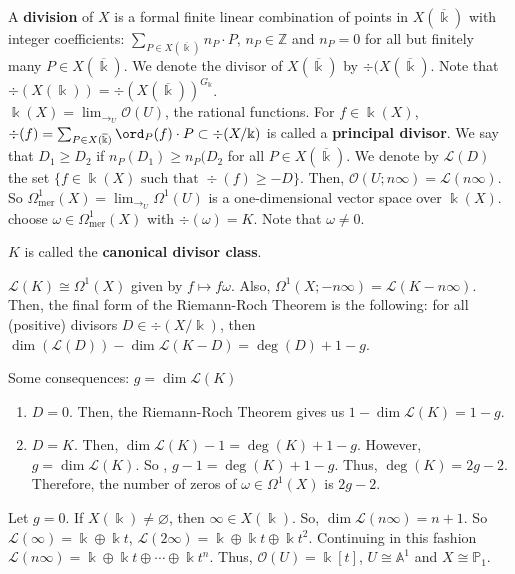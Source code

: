 A \textbf{division} of $X$ is a formal finite linear combination of points in $X(\overline{\Bbbk})$ with integer coefficients: $\sum_{P \in X(\overline{\Bbbk})} n_{P}\cdot P$, $n_{P} \in \mathbb{Z}$ and $n_{P}=0$ for all but finitely many $P \in X(\overline{\Bbbk})$.  We denote the divisor of $X(\overline{\Bbbk})$ by $\div(X(\overline{\Bbbk})$.  Note that $\div(X(\Bbbk))=\div(X(\overline{\Bbbk}))^{G_{\Bbbk}}$.\\
\indent $\Bbbk(X)=\lim_{\to_{U}} \mathscr{O}(U)$, the rational functions.  For $f \in \Bbbk(X)$, $\div(f)=\sum_{P \in X(\overline{\Bbbk})} \ord_{P}(f) \cdot P \subset \div(X/\Bbbk)$ is called a \textbf{principal divisor}.  We say that $D_{1} \ge D_{2}$ if $n_{P}(D_{1}) \ge n_{P}(D_{2}$ for all $P \in X(\overline{\Bbbk})$.  We denote by $\mathscr{L}(D)$ the set $\{f \in \Bbbk(X) \text{ such that } \div(f) \ge -D\}$.  Then, $\mathscr{O}(U;n\infty)=\mathscr{L}(n\infty)$.  So $\Omega_{\text{mer}}^{1}(X)=\lim_{\to_{U}} \Omega^{1}(U)$ is a one-dimensional vector space over $\Bbbk(X)$.  choose $\omega \in \Omega_{\text{mer}}^{1}(X)$ with $\div(\omega)=K$.  Note that $\omega \ne 0$.
\begin{definition}
$K$ is called the \textbf{canonical divisor class}.
\end{definition}
\begin{remark}
$\mathscr{L}(K) \cong \Omega^{1}(X)$ given by $f \mapsto f\omega$.  Also, $\Omega^{1}(X;-n\infty)=\mathscr{L}(K-n\infty)$.  Then, the final form of the Riemann-Roch Theorem is the following:  for all (positive) divisors $D \in \div(X/\Bbbk)$, then $\dim(\mathscr{L}(D))-\dim\mathscr{L}(K-D)=\deg(D)+1-g$.
\end{remark}
\indent Some consequences:  $g=\dim \mathscr{L}(K)$
\begin{enumerate}[\upshape (a)]
\item $D=0$.  Then, the Riemann-Roch Theorem gives us $1-\dim \mathscr{L}(K)=1-g$.
\item $D=K$.  Then, $\dim \mathscr{L}(K)-1=\deg (K)+1-g$.  However, $g=\dim \mathscr{L}(K)$.  So , $g-1=\deg(K)+1-g$.  Thus, $\deg(K)=2g-2$.  Therefore, the number of zeros of $\omega \in \Omega^{1}(X)$ is $2g-2$.
\end{enumerate}
Let $g=0$.  If $X(\Bbbk) \ne \varnothing$, then $\infty \in X(\Bbbk)$.  So, $\dim \mathscr{L}(n\infty)=n+1$.  So $\mathscr{L}(\infty)=\Bbbk \oplus \Bbbk t$, $\mathscr{L}(2\infty)=\Bbbk \oplus \Bbbk t \oplus \Bbbk t^{2}$.  Continuing in this fashion $\mathscr{L}(n\infty)=\Bbbk \oplus \Bbbk t \oplus \dotsb \oplus \Bbbk t^{n}$.  Thus, $\mathscr{O}(U)=\Bbbk[t]$, $U \cong \mathbb{A}^{1}$ and $X \cong \mathbb{P}_{1}$.\\
